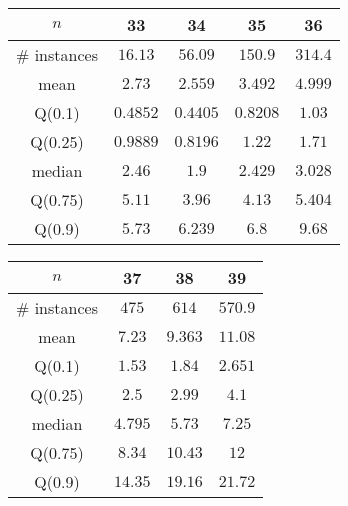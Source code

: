 \begin{tabular}{c|cccc} 
\hline 
$n$ & 33 & 34 & 35 & 36 \tabularnewline 
\hline 
\hline 
\# instances & $16.13$ & $56.09$ & $150.9$ & $314.4$ \tabularnewline 
mean & $2.73$ & $2.559$ & $3.492$ & $4.999$ \tabularnewline 
Q(0.1) & $0.4852$ & $0.4405$ & $0.8208$ & $1.03$ \tabularnewline 
Q(0.25) & $0.9889$ & $0.8196$ & $1.22$ & $1.71$ \tabularnewline 
median & $2.46$ & $1.9$ & $2.429$ & $3.028$ \tabularnewline 
Q(0.75) & $5.11$ & $3.96$ & $4.13$ & $5.404$ \tabularnewline 
Q(0.9) & $5.73$ & $6.239$ & $6.8$ & $9.68$ \tabularnewline 
\hline 
\end{tabular} 
\medskip{} 

\begin{tabular}{c|ccc} 
\hline 
$n$ & 37 & 38 & 39 \tabularnewline 
\hline 
\hline 
\# instances & $475$ & $614$ & $570.9$ \tabularnewline 
mean & $7.23$ & $9.363$ & $11.08$ \tabularnewline 
Q(0.1) & $1.53$ & $1.84$ & $2.651$ \tabularnewline 
Q(0.25) & $2.5$ & $2.99$ & $4.1$ \tabularnewline 
median & $4.795$ & $5.73$ & $7.25$ \tabularnewline 
Q(0.75) & $8.34$ & $10.43$ & $12$ \tabularnewline 
Q(0.9) & $14.35$ & $19.16$ & $21.72$ \tabularnewline 
\hline 
\end{tabular} 
\medskip{} 

